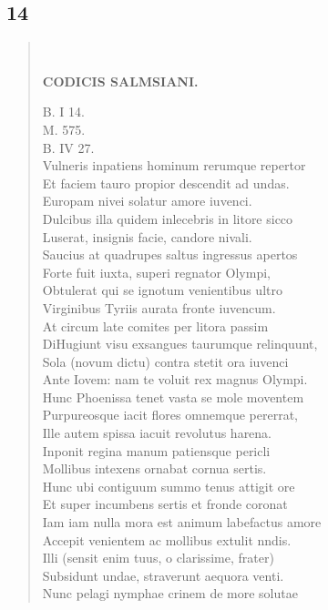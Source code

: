 \documentclass[11pt, a4paper]{report}
\begin{document}
            \subsection*{14}
      \begin{verse}
      
        ﻿\pagebreak 
    \begin{center} \textbf{CODICIS SALMSIANI.} \end{center} \marginpar{[49]} B. I 14. \\ M. 575. \\ B. IV 27. \\ Vulneris inpatiens hominum rerumque repertor \\ Et faciem tauro propior descendit ad undas. \\ Europam nivei solatur amore iuvenci. \\ Dulcibus illa quidem inlecebris in litore sicco \\ Luserat, insignis facie, candore nivali. \\ Saucius at quadrupes saltus ingressus apertos \\ Forte fuit iuxta, superi regnator Olympi, \\ Obtulerat qui se ignotum venientibus ultro \\ Virginibus Tyriis aurata fronte iuvencum. \\ At circum late comites per litora passim \\ DiHugiunt visu exsangues taurumque relinquunt, \\ Sola (novum dictu) contra stetit ora iuvenci \\ Ante Iovem: nam te voluit rex magnus Olympi. \\ Hunc Phoenissa tenet vasta se mole moventem \\ Purpureosque iacit flores omnemque pererrat, \\ Ille autem spissa iacuit revolutus harena. \\ Inponit regina manum patiensque pericli \\ Mollibus intexens ornabat cornua sertis. \\ Hunc ubi contiguum summo tenus attigit ore \\ Et super incumbens sertis et fronde coronat \\ Iam iam nulla mora est animum labefactus amore \\ Accepit venientem ac mollibus extulit nndis. \\ Illi (sensit enim tuus, o clarissime, frater) \\ Subsidunt undae, straverunt aequora venti. \\ Nunc pelagi nymphae crinem de more solutae \\ 

\end{verse}
\end{document}
